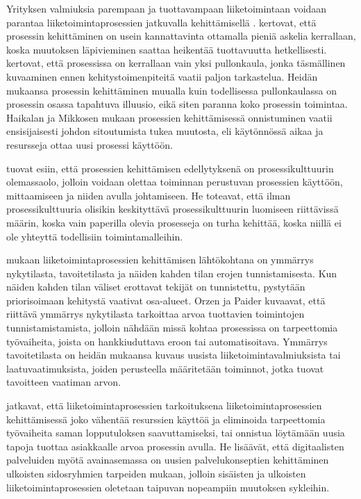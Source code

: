 \documentclass[finnish,12pt,a4paper,pdftex]{article}
\begin{document}
Yrityksen valmiuksia parempaan ja tuottavampaan liiketoimintaan voidaan parantaa liiketoimintaprosessien jatkuvalla kehittämisellä \citep{teollisuustalous, leanit, ohjelmistotuotanto}. \citeauthor{ohjelmistotuotanto} kertovat, että prosessin kehittäminen on usein kannattavinta ottamalla pieniä askelia kerrallaan, koska muutoksen läpivieminen saattaa heikentää tuottavuutta hetkellisesti. \cite{devops} kertovat, että prosessissa on kerrallaan vain yksi pullonkaula, jonka täsmällinen kuvaaminen ennen kehitystoimenpiteitä vaatii paljon tarkastelua. Heidän mukaansa prosessin kehittäminen muualla kuin todellisessa pullonkaulassa on prosessin osassa tapahtuva illuusio, eikä siten paranna koko prosessin toimintaa. Haikalan ja Mikkosen \citeyearpar{okaytannot} mukaan prosessien kehittämisessä onnistuminen vaatii ensisijaisesti johdon sitoutumista tukea muutosta, eli käytönnössä aikaa ja resursseja ottaa uusi prosessi käyttöön.

\cite{teollisuustalous} tuovat esiin, että prosessien kehittämisen edellytyksenä on prosessikulttuurin olemassaolo, jolloin voidaan olettaa toiminnan perustuvan prosessien käyttöön, mittaamiseen ja niiden avulla johtamiseen. He toteavat, että ilman prosessikulttuuria olisikin keskityttävä prosessikulttuurin luomiseen riittävissä määrin, koska vain paperilla olevia prosesseja on turha kehittää, koska niillä ei ole yhteyttä todellisiin toimintamalleihin.

\cite{leanit} mukaan liiketoimintaprosessien kehittämisen lähtökohtana on ymmärrys nykytilasta, tavoitetilasta ja näiden kahden tilan erojen tunnistamisesta. Kun näiden kahden tilan väliset erottavat tekijät on tunnistettu, pystytään priorisoimaan kehitystä vaativat osa-alueet. Orzen ja Paider kuvaavat, että riittävä ymmärrys nykytilasta tarkoittaa arvoa tuottavien toimintojen tunnistamistamista, jolloin nähdään missä kohtaa prosessissa on tarpeettomia työvaiheita, joista on hankkiuduttava eroon tai automatisoitava. Ymmärrys tavoitetilasta on heidän mukaansa kuvaus uusista liiketoimintavalmiuksista tai laatuvaatimuksista, joiden perusteella määritetään  toiminnot, jotka tuovat tavoitteen vaatiman arvon. 

\cite{leanit} jatkavat, että liiketoimintaprosessien tarkoituksena liiketoimintaprosessien kehittämisessä joko vähentää resurssien käyttöä ja eliminoida tarpeettomia työvaiheita saman lopputuloksen saavuttamiseksi, tai onnistua löytämään uusia tapoja tuottaa asiakkaalle arvoa prosessin avulla. He lisäävät, että digitaalisten palveluiden myötä avainasemassa on uusien palvelukonseptien kehittäminen ulkoisten sidosryhmien tarpeiden mukaan, jolloin sisäisten ja ulkoisten liiketoimintaprosessien oletetaan taipuvan nopeampiin muutoksen sykleihin.
\end{document}
